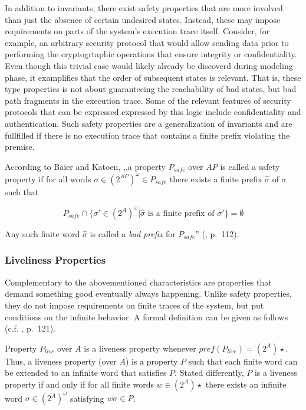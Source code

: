 In addition to invariants, there exist safety properties that are more involved than just the absence of certain undesired states.
Instead, these may impose requirements on parts of the system's execution trace itself.
Consider, for example, an arbitrary security protocol that would allow sending data prior to performing the cryptogrtaphic operations that ensure integrity or confidentiality.
Even though this trivial case would likely already be discoverd during modeling phase, it examplifies that the order of subsequent states is relevant.
That is, these type properties is not about guaranteeing the reachability of bad states, but bad path fragments in the execution trace.
Some of the relevant features of security protocols that can be expressed expressed by this logic include confidentiality and authentication.
Such safety properties are a generalization of invariants and are fullfilled if there is no execution trace that contains a finite prefix violating the premise.

According to Baier and Katoen, ,,a property $P_{safe}$ over $AP$ is called a safety property if for all words $\sigma \in (2^{AP})^{\omega} \in P_{safe}$ there exists a finite prefix $\widehat{\sigma}$ of $\sigma$ such that

\begin{equation*}
    P_{safe} \cap \{ \sigma' \in (2^{A})^{\omega} | \widehat{\sigma} \text{ is a finite prefix of } \sigma' \} = \emptyset
\end{equation*}

\noindent
Any such finite word $\widehat{\sigma}$ is called a \textit{bad prefix} for $P_{safe}$'' (\cite{baier2008principles}, p.~112).

\subsubsection{Liveliness Properties}

Complementary to the abovementioned characteristics are properties that demand something good eventually always happening.
Unlike safety properties, they do not impose requirements on finite traces of the system, but put conditions on the infinite behavior.
A formal definition can be given as follows (c.f. \cite{baier2008principles}, p.~121).

Property $P_{live}$ over $A$ is a liveness property whenever $pref(P_{live}) = (2^{A})\star$.
Thus, a liveness property (over $A$) is a property $P$ such that each finite word can be extended to an infinite word that satisfies $P$.
Stated differently, $P$ is a liveness property if and only if for all finite words $w \in (2^{A})\star$ there exists an infinite word $\sigma \in (2^{A})^\omega$ satisfying $w \sigma \in P $.

